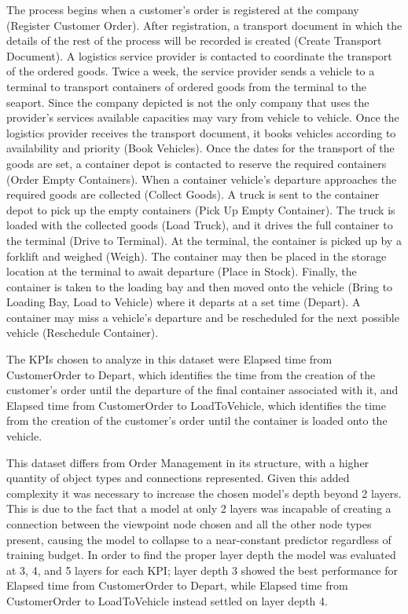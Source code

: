 		The process begins when a customer's order is registered at the company (Register Customer Order). After registration, a transport document in which the details of the rest of the process will be recorded is created (Create Transport Document). 
		A logistics service provider is contacted to coordinate the transport of the ordered goods. Twice a week, the service provider sends a vehicle to a terminal to transport containers of ordered goods from the terminal to the seaport. Since the company depicted is not the only company that uses the provider's services available capacities may vary from vehicle to vehicle. Once the logistics provider receives the transport document, it books vehicles according to availability and priority (Book Vehicles). Once the dates for the transport of the goods are set, a container depot is contacted to reserve the required containers (Order Empty Containers).
		When a container vehicle's departure approaches the required goods are collected (Collect Goods). A truck is sent to the container depot to pick up the empty containers (Pick Up Empty Container). The truck is loaded with the collected goods (Load Truck), and it drives the full container to the terminal (Drive to Terminal).
		At the terminal, the container is picked up by a forklift and weighed (Weigh). The container may then be placed in the storage location at the terminal to await departure (Place in Stock). Finally, the container is taken to the loading bay and then moved onto the vehicle (Bring to Loading Bay, Load to Vehicle) where it departs at a set time (Depart).
		A container may miss a vehicle's departure and be rescheduled for the next possible vehicle (Reschedule Container).

		The KPIs chosen to analyze in this dataset were Elapsed time from CustomerOrder to Depart, which identifies the time from the creation of the customer's order until the departure of the final container associated with it, and Elapsed time from CustomerOrder to LoadToVehicle, which identifies the time from the creation of the customer's order until the container is loaded onto the vehicle.

		This dataset differs from Order Management in its structure, with a higher quantity of object types and connections represented. Given this added complexity it was necessary to increase the chosen model's depth beyond 2 layers. This is due to the fact that a model at only 2 layers was incapable of creating a connection between the viewpoint node chosen and all the other node types present, causing the model to collapse to a near-constant predictor regardless of training budget. In order to find the proper layer depth the model was evaluated at 3, 4, and 5 layers for each KPI; layer depth 3 showed the best performance for Elapsed time from CustomerOrder to Depart, while Elapsed time from CustomerOrder to LoadToVehicle instead settled on layer depth 4.

